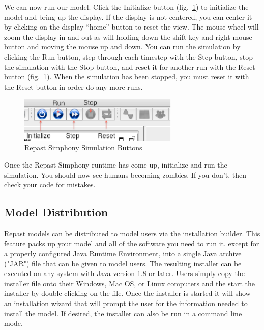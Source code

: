 \documentclass[11pt]{amsart}
\begin{document}
We can now run our model. Click the Initialize button (fig.~\ref{fig:buttons}) to initialize the model and bring up the display. If the display is not centered, you can center it by clicking on the display ``home'' button to reset the view. The mouse wheel will zoom the display in and out as will holding down the shift key and right mouse button and moving the mouse up and down. You can run the simulation by clicking the Run button, step through each timestep with the Step button, stop the simulation with the Stop button, and reset it for another run with the Reset button (fig.~\ref{fig:buttons}). When the simulation has been stopped, you must reset it with the Reset button in order do any more runs.

\begin{figure}[h]
\begin{center}
\vspace{.2in}
\centerline {
\includegraphics[width=3in]{figs/buttons.eps}
}
\caption{Repast Simphony Simulation Buttons}
\label{fig:buttons}
\end{center}
\end{figure}

Once the Repast Simphony runtime has come up, initialize and run the simulation. You should now see humans becoming zombies. If you don't, then check your code for mistakes.

\subsection{Model Distribution}

Repast models can be distributed to model users via the installation builder. This feature packs up your model and all of the software you need to run it, except for a properly configured Java Runtime Environment, into a single Java archive ("JAR") file that can be given to model users. The resulting installer can be executed on any system with Java version 1.8 or later. Users simply copy the installer file onto their Windows, Mac OS, or Linux computers and the start the installer by double clicking on the file. Once the installer is started it will show an installation wizard that will prompt the user for the information needed to install the model. If desired, the installer can also be run in a command line mode.
\end{document}
